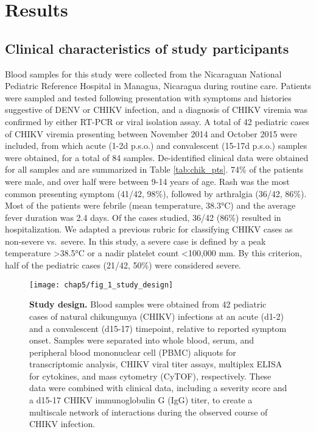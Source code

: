 \section{Results}

\subsection{Clinical characteristics of study participants}

Blood samples for this study were collected from the Nicaraguan National Pediatric Reference Hospital in Managua, Nicaragua during routine care. Patients were sampled and tested following presentation with symptoms and histories suggestive of DENV or CHIKV infection, and a diagnosis of CHIKV viremia was confirmed by either RT-PCR or viral isolation assay. A total of 42 pediatric cases of CHIKV viremia presenting between November 2014 and October 2015 were included, from which acute (1-2d p.s.o.) and convalescent (15-17d p.s.o.) samples were obtained, for a total of 84 samples.
De-identified clinical data were obtained for all samples and are summarized in Table \ref{tab:chik_pts}. 74\% of the patients were male, and over half were between 9-14 years of age. Rash was the most common presenting symptom (41/42, 98\%), followed by arthralgia (36/42, 86\%). Most of the patients were febrile (mean temperature, 38.3°C) and the average fever duration was 2.4 days. Of the cases studied, 36/42 (86\%) resulted in hospitalization. We adapted a previous rubric for classifying CHIKV cases as non-severe vs.\ severe.\autocite{Chow2011,Ng2009} In this study, a severe case is defined by a peak temperature >38.5°C or a nadir platelet count <100,000 mm. By this criterion, half of the pediatric cases (21/42, 50\%) were considered severe.

\begin{figure}[htb]
  \texttt{[image: chap5/fig\_1\_study\_design]}
  \caption[Study design]{\textbf{Study design.} Blood samples were obtained from 42 pediatric cases of natural chikungunya (CHIKV) infections at an acute (d1-2) and a convalescent (d15-17) timepoint, relative to reported symptom onset. Samples were separated into whole blood, serum, and peripheral blood mononuclear cell (PBMC) aliquots for transcriptomic analysis, CHIKV viral titer assays, multiplex ELISA for cytokines, and mass cytometry (CyTOF), respectively. These data were combined with clinical data, including a severity score and a d15-17 CHIKV immunoglobulin G (IgG) titer, to create a multiscale network of interactions during the observed course of CHIKV infection.
  }
  \label{fig:chik_study_design}
\end{figure}

